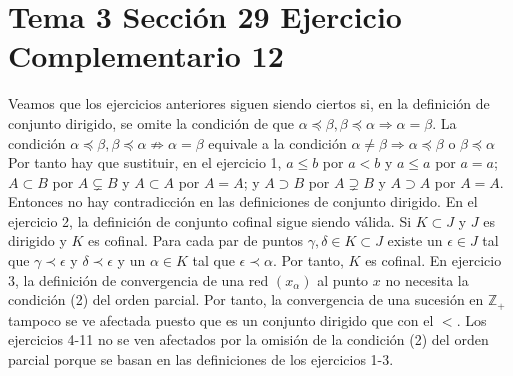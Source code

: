 \documentclass{article}
\begin{document}
\section{Tema 3 Sección 29 Ejercicio Complementario 12}
Veamos que los ejercicios anteriores siguen siendo ciertos si, en la definición de conjunto dirigido, se omite la condición de que $\alpha\preceq\beta,\beta\preceq\alpha\Rightarrow \alpha=\beta$. La condición $\alpha\preceq\beta,\beta\preceq\alpha\nRightarrow \alpha=\beta$ equivale a la condición $\alpha\neq\beta\Rightarrow\alpha\preceq\beta \text{ o }\beta\preceq\alpha$   
Por tanto hay que sustituir, en el ejercicio 1, $a\leq b$ por $a<b$ y $a\leq a$ por $a=a$; $A\subset B$ por $A\subsetneq B$ y $A\subset A$ por $A=A$; y $A\supset B$ por $A\supsetneq B$ y $A\supset A$ por $A=A$. Entonces no hay contradicción en las definiciones de conjunto dirigido. En el ejercicio 2, la definición de conjunto cofinal sigue siendo válida. Si $K\subset J$ y $J$ es dirigido y $K$ es cofinal. Para cada par de puntos $\gamma, \delta\in K\subset J$  existe un $\epsilon \in J$ tal que $\gamma\prec \epsilon$ y $\delta\prec \epsilon$ y un $\alpha \in K$ tal que $\epsilon \prec \alpha$. Por tanto, $K$ es cofinal. En ejercicio 3, la definición de convergencia de una red $(x_\alpha)$ al punto $x$ no necesita la condición (2) del orden parcial. Por tanto, la convergencia de una sucesión en $\mathbb{Z}_+$ tampoco se ve afectada puesto que es un conjunto dirigido que con el $<$. Los ejercicios 4-11 no se ven afectados por la omisión de la condición (2) del orden parcial porque se basan en las definiciones de los ejercicios 1-3.
\end{document}
